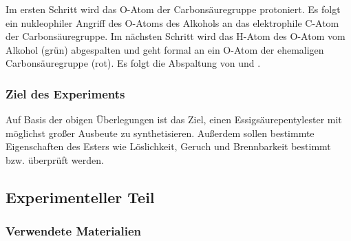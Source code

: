 \documentclass{article}
\begin{document}
        Im ersten Schritt wird das O-Atom der Carbonsäuregruppe protoniert. Es folgt ein nukleophiler Angriff des O-Atoms des Alkohols an das elektrophile C-Atom der Carbonsäuregruppe. Im nächsten Schritt wird das H-Atom des O-Atom vom Alkohol (grün) abgespalten und geht formal an ein O-Atom der ehemaligen Carbonsäuregruppe (rot). Es folgt die Abspaltung von  und . 
        
      \subsubsection{Ziel des Experiments}
    
        Auf Basis der obigen Überlegungen ist das Ziel, einen Essigsäurepentylester mit möglichst großer Ausbeute zu synthetisieren. Außerdem sollen bestimmte Eigenschaften des Esters wie Löslichkeit, Geruch und Brennbarkeit bestimmt bzw. überprüft werden. 
    
    \subsection{Experimenteller Teil}
  
      \subsubsection{Verwendete Materialien}
              
\end{document}
